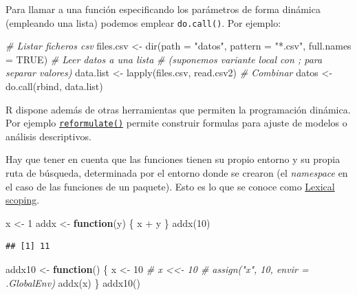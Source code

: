 \documentclass[
]{book}
\newenvironment{Shaded}{\begin{snugshade}}{\end{snugshade}}
\newcommand{\AttributeTok}[1]{\textcolor[rgb]{0.77,0.63,0.00}{#1}}
\newcommand{\CommentTok}[1]{\textcolor[rgb]{0.56,0.35,0.01}{\textit{#1}}}
\newcommand{\ConstantTok}[1]{\textcolor[rgb]{0.00,0.00,0.00}{#1}}
\newcommand{\ControlFlowTok}[1]{\textcolor[rgb]{0.13,0.29,0.53}{\textbf{#1}}}
\newcommand{\DecValTok}[1]{\textcolor[rgb]{0.00,0.00,0.81}{#1}}
\newcommand{\FunctionTok}[1]{\textcolor[rgb]{0.00,0.00,0.00}{#1}}
\newcommand{\NormalTok}[1]{#1}
\newcommand{\OtherTok}[1]{\textcolor[rgb]{0.56,0.35,0.01}{#1}}
\newcommand{\SpecialCharTok}[1]{\textcolor[rgb]{0.00,0.00,0.00}{#1}}
\newcommand{\StringTok}[1]{\textcolor[rgb]{0.31,0.60,0.02}{#1}}
\theoremstyle{break}
\theoremstyle{nonumberplain}
\begin{document}
Para llamar a una función especificando los parámetros de forma dinámica (empleando una lista) podemos emplear \texttt{do.call()}.
Por ejemplo:

\begin{Shaded}
\begin{Highlighting}[]
\CommentTok{\# Listar ficheros csv }
\NormalTok{files.csv }\OtherTok{\textless{}{-}} \FunctionTok{dir}\NormalTok{(}\AttributeTok{path =} \StringTok{"datos"}\NormalTok{, }\AttributeTok{pattern =} \StringTok{"*.csv"}\NormalTok{, }\AttributeTok{full.names =} \ConstantTok{TRUE}\NormalTok{)}
\CommentTok{\# Leer datos a una lista}
\CommentTok{\# (suponemos variante local con ; para separar valores)}
\NormalTok{data.list }\OtherTok{\textless{}{-}} \FunctionTok{lapply}\NormalTok{(files.csv, read.csv2)}
\CommentTok{\# Combinar }
\NormalTok{datos }\OtherTok{\textless{}{-}} \FunctionTok{do.call}\NormalTok{(}\StringTok{\textquotesingle{}rbind\textquotesingle{}}\NormalTok{, data.list)}
\end{Highlighting}
\end{Shaded}

R dispone además de otras herramientas que permiten la programación dinámica.
Por ejemplo \href{https://rdrr.io/r/stats/delete.response.html}{\texttt{reformulate()}} permite construir formulas para ajuste de modelos o análisis descriptivos.

Hay que tener en cuenta que las funciones tienen su propio entorno y su propia ruta de búsqueda, determinada por el entorno donde se crearon (el \emph{namespace} en el caso de las funciones de un paquete).
Esto es lo que se conoce como \href{https://adv-r.hadley.nz/functions.html\#lexical-scoping}{Lexical scoping}.

\begin{Shaded}
\begin{Highlighting}[]
\NormalTok{x }\OtherTok{\textless{}{-}} \DecValTok{1}
\NormalTok{addx }\OtherTok{\textless{}{-}} \ControlFlowTok{function}\NormalTok{(y) \{}
\NormalTok{  x }\SpecialCharTok{+}\NormalTok{ y}
\NormalTok{\}}
\FunctionTok{addx}\NormalTok{(}\DecValTok{10}\NormalTok{)}
\end{Highlighting}
\end{Shaded}

\begin{verbatim}
## [1] 11
\end{verbatim}

\begin{Shaded}
\begin{Highlighting}[]
\NormalTok{addx10 }\OtherTok{\textless{}{-}} \ControlFlowTok{function}\NormalTok{() \{}
\NormalTok{  x }\OtherTok{\textless{}{-}} \DecValTok{10}   \CommentTok{\# x \textless{}\textless{}{-} 10   \# assign("x", 10, envir = .GlobalEnv)}
  \FunctionTok{addx}\NormalTok{(x)}
\NormalTok{\}}
\FunctionTok{addx10}\NormalTok{()}
\end{Highlighting}
\end{Shaded}
\end{document}
